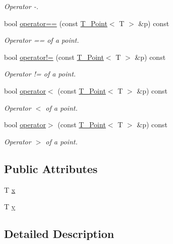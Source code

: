 \begin{DoxyCompactItemize}
\begin{DoxyCompactList}\small\item\em Operator -\/. \end{DoxyCompactList}\item 
bool \hyperlink{classT__Point_a83c15f53049523cc75c23350ceb4832a}{operator==} (const \hyperlink{classT__Point}{T\+\_\+\+Point}$<$ T $>$ \&p) const
\begin{DoxyCompactList}\small\item\em Operator == of a point. \end{DoxyCompactList}\item 
bool \hyperlink{classT__Point_ab92f1605c6f5008b42105b4c7a7fc1b2}{operator!=} (const \hyperlink{classT__Point}{T\+\_\+\+Point}$<$ T $>$ \&p) const
\begin{DoxyCompactList}\small\item\em Operator != of a point. \end{DoxyCompactList}\item 
bool \hyperlink{classT__Point_a95cb559fe5888b44481f6ad3aebabefe}{operator$<$} (const \hyperlink{classT__Point}{T\+\_\+\+Point}$<$ T $>$ \&p) const
\begin{DoxyCompactList}\small\item\em Operator $<$ of a point. \end{DoxyCompactList}\item 
bool \hyperlink{classT__Point_a0a9956de8ab7c8dccf35b78c43aedefd}{operator$>$} (const \hyperlink{classT__Point}{T\+\_\+\+Point}$<$ T $>$ \&p) const
\begin{DoxyCompactList}\small\item\em Operator $>$ of a point. \end{DoxyCompactList}\end{DoxyCompactItemize}
\subsection*{Public Attributes}
\begin{DoxyCompactItemize}
\item 
T \hyperlink{classT__Point_a45cc1c670a8d9bc786a38428cdce4bd2}{x}
\item 
T \hyperlink{classT__Point_a28da35a974844bdb3509a90345d3c1f9}{y}
\end{DoxyCompactItemize}


\subsection{Detailed Description}
